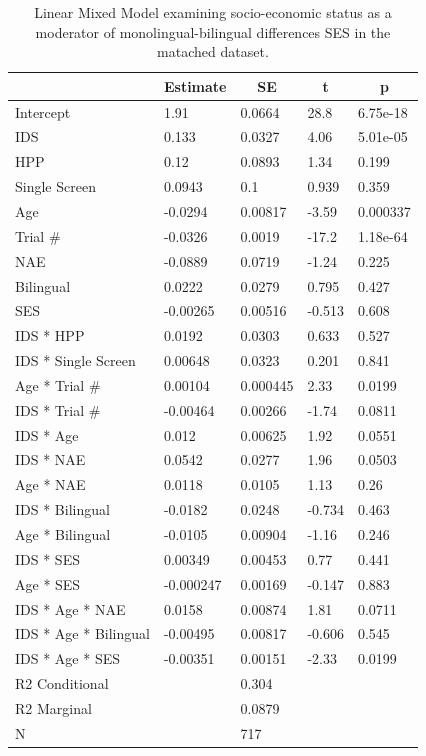 \documentclass[
  english,
  ,man,floatsintext]{apa6}
\begin{document}
\begin{table}[tbp]
\begin{center}
\begin{threeparttable}
\caption{\label{tab:unnamed-chunk-15}Linear Mixed Model examining socio-economic status as a moderator of monolingual-bilingual differences SES in the matached dataset.}
\begin{tabular}{lllll}
\toprule
 & \multicolumn{1}{c}{Estimate} & \multicolumn{1}{c}{SE} & \multicolumn{1}{c}{t} & \multicolumn{1}{c}{p}\\
\midrule
Intercept & 1.91 & 0.0664 & 28.8 & 6.75e-18\\
IDS & 0.133 & 0.0327 & 4.06 & 5.01e-05\\
HPP & 0.12 & 0.0893 & 1.34 & 0.199\\
Single Screen & 0.0943 & 0.1 & 0.939 & 0.359\\
Age & -0.0294 & 0.00817 & -3.59 & 0.000337\\
Trial \# & -0.0326 & 0.0019 & -17.2 & 1.18e-64\\
NAE & -0.0889 & 0.0719 & -1.24 & 0.225\\
Bilingual & 0.0222 & 0.0279 & 0.795 & 0.427\\
SES & -0.00265 & 0.00516 & -0.513 & 0.608\\
IDS * HPP & 0.0192 & 0.0303 & 0.633 & 0.527\\
IDS * Single Screen & 0.00648 & 0.0323 & 0.201 & 0.841\\
Age * Trial \# & 0.00104 & 0.000445 & 2.33 & 0.0199\\
IDS * Trial \# & -0.00464 & 0.00266 & -1.74 & 0.0811\\
IDS * Age & 0.012 & 0.00625 & 1.92 & 0.0551\\
IDS * NAE & 0.0542 & 0.0277 & 1.96 & 0.0503\\
Age * NAE & 0.0118 & 0.0105 & 1.13 & 0.26\\
IDS * Bilingual & -0.0182 & 0.0248 & -0.734 & 0.463\\
Age * Bilingual & -0.0105 & 0.00904 & -1.16 & 0.246\\
IDS * SES & 0.00349 & 0.00453 & 0.77 & 0.441\\
Age * SES & -0.000247 & 0.00169 & -0.147 & 0.883\\
IDS * Age * NAE & 0.0158 & 0.00874 & 1.81 & 0.0711\\
IDS * Age * Bilingual & -0.00495 & 0.00817 & -0.606 & 0.545\\
IDS * Age * SES & -0.00351 & 0.00151 & -2.33 & 0.0199\\ \midrule
R2 Conditional &  & 0.304 &  & \\
R2 Marginal &  & 0.0879 &  & \\ \midrule
N &  & 717 &  & \\
\bottomrule
\end{tabular}
\end{threeparttable}
\end{center}
\end{table}
\end{document}
